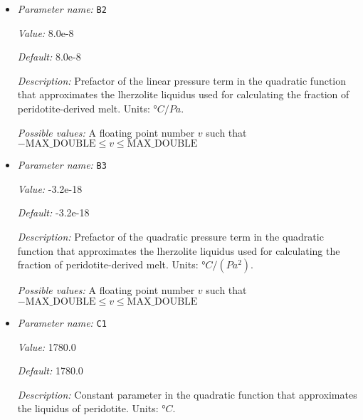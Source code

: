\begin{itemize}
{\it Default:} 1475.0


{\it Description:} Constant parameter in the quadratic function that approximates the lherzolite liquidus used for calculating the fraction of peridotite-derived melt. Units: $°C$.


{\it Possible values:} A floating point number $v$ such that $-\text{MAX\_DOUBLE} \leq v \leq \text{MAX\_DOUBLE}$
\item {\it Parameter name:} {\tt B2}
\label{parameters:Material model/Latent heat melt/B2}
\label{parameters:Material_20model/Latent_20heat_20melt/B2}


{\it Value:} 8.0e-8


{\it Default:} 8.0e-8


{\it Description:} Prefactor of the linear pressure term in the quadratic function that approximates the  lherzolite liquidus used for calculating the fraction of peridotite-derived melt. Units: $°C/Pa$.


{\it Possible values:} A floating point number $v$ such that $-\text{MAX\_DOUBLE} \leq v \leq \text{MAX\_DOUBLE}$
\item {\it Parameter name:} {\tt B3}
\label{parameters:Material model/Latent heat melt/B3}
\label{parameters:Material_20model/Latent_20heat_20melt/B3}


{\it Value:} -3.2e-18


{\it Default:} -3.2e-18


{\it Description:} Prefactor of the quadratic pressure term in the quadratic function that approximates the  lherzolite liquidus used for calculating the fraction of peridotite-derived melt. Units: $°C/(Pa^2)$.


{\it Possible values:} A floating point number $v$ such that $-\text{MAX\_DOUBLE} \leq v \leq \text{MAX\_DOUBLE}$
\item {\it Parameter name:} {\tt C1}
\label{parameters:Material model/Latent heat melt/C1}
\label{parameters:Material_20model/Latent_20heat_20melt/C1}


{\it Value:} 1780.0


{\it Default:} 1780.0


{\it Description:} Constant parameter in the quadratic function that approximates the liquidus of peridotite. Units: $°C$.



\end{itemize}
